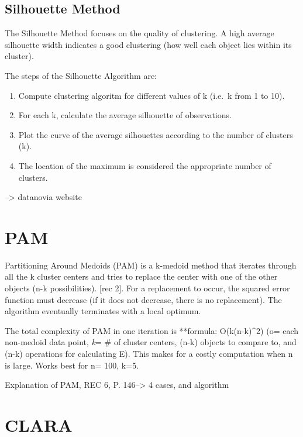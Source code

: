 \documentclass[12pt,twoside]{amherstthesis}
\providecommand{\tightlist}{%
  \setlength{\itemsep}{0pt}\setlength{\parskip}{0pt}}
\begin{document}
  \subsection{Silhouette Method}\label{silhouette-method}
  
  The Silhouette Method focuses on the quality of clustering. A high
  average silhouette width indicates a good clustering (how well each
  object lies within its cluster).
  
  The steps of the Silhouette Algorithm are:
  
  \begin{enumerate}
  \def\labelenumi{\arabic{enumi}.}
  \tightlist
  \item
    Compute clustering algoritm for different values of k (i.e.~k from 1
    to 10).
  \item
    For each k, calculate the average silhouette of observations.
  \item
    Plot the curve of the average silhouettes according to the number of
    clusters (k).
  \item
    The location of the maximum is considered the appropriate number of
    clusters.
  \end{enumerate}
  
  --\textgreater{} datanovia website
  
  \section{PAM}\label{pam}
  
  Partitioning Around Medoids (PAM) is a k-medoid method that iterates
  through all the k cluster centers and tries to replace the center with
  one of the other objects (n-k possibilities). {[}rec 2{]}. For a
  replacement to occur, the squared error function must decrease (if it
  does not decrease, there is no replacement). The algorithm eventually
  terminates with a local optimum.
  
  The total complexity of PAM in one iteration is **formula:
  O(k(n-k)\^{}2) (o= each non-medoid data point, \emph{k}= \# of cluster
  centers, (n-k) objects to compare to, and (n-k) operations for
  calculating E). This makes for a costly computation when n is large.
  Works best for n= 100, k=5.
  
  Explanation of PAM, REC 6, P. 146--\textgreater{} 4 cases, and algorithm
  
  \section{CLARA}\label{clara}
  
\end{document}

